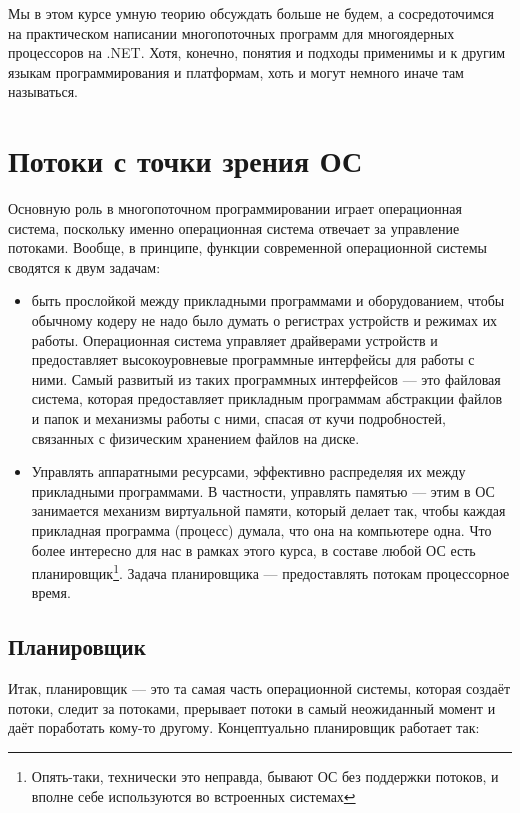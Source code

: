\documentclass{../../text-style}
\begin{document}
Мы в этом курсе умную теорию обсуждать больше не будем, а сосредоточимся на практическом написании многопоточных программ для многоядерных процессоров на .NET. Хотя, конечно, понятия и подходы применимы и к другим языкам программирования и платформам, хоть и могут немного иначе там называться.

\section{Потоки с точки зрения ОС}

Основную роль в многопоточном программировании играет операционная система, поскольку именно операционная система отвечает за управление потоками. Вообще, в принципе, функции современной операционной системы сводятся к двум задачам:

\begin{itemize}
    \item быть прослойкой между прикладными программами и оборудованием, чтобы обычному кодеру не надо было думать о регистрах устройств и режимах их работы. Операционная система управляет драйверами устройств и предоставляет высокоуровневые программные интерфейсы для работы с ними. Самый развитый из таких программных интерфейсов --- это файловая система, которая предоставляет прикладным программам абстракции файлов и папок и механизмы работы с ними, спасая от кучи подробностей, связанных с физическим хранением файлов на диске.
    \item Управлять аппаратными ресурсами, эффективно распределяя их между прикладными программами. В частности, управлять памятью --- этим в ОС занимается механизм виртуальной памяти, который делает так, чтобы каждая прикладная программа (процесс) думала, что она на компьютере одна. Что более интересно для нас в рамках этого курса, в составе любой ОС есть планировщик\footnote{Опять-таки, технически это неправда, бывают ОС без поддержки потоков, и вполне себе используются во встроенных системах}. Задача планировщика --- предоставлять потокам процессорное время.
\end{itemize}

\subsection{Планировщик}

Итак, планировщик --- это та самая часть операционной системы, которая создаёт потоки, следит за потоками, прерывает потоки в самый неожиданный момент и даёт поработать кому-то другому. Концептуально планировщик работает так:
\end{document}
